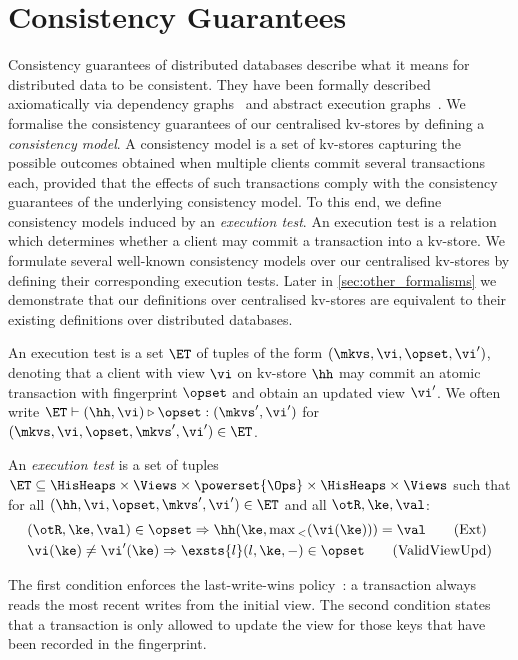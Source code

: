 \section{Consistency Guarantees}
\label{sec:cm}
Consistency guarantees of distributed databases describe
what it means for distributed data to be consistent. 
They have been formally described axiomatically via dependency graphs~\cite{adya-icde,adya}
and abstract execution graphs~\cite{ev_transactions,framework-concur}. 
We formalise the consistency guarantees of our centralised kv-stores by defining a 
\emph{consistency model}. 
A consistency model is a set of kv-stores capturing the possible outcomes 
obtained when multiple clients commit several transactions each, 
provided that the effects of such transactions comply with the consistency guarantees of the underlying consistency model. 
To this end, we define consistency models induced by an \emph{execution test}.
An execution test is a relation which determines whether a client may commit a transaction into a kv-store.  
We formulate several well-known consistency models over our centralised kv-stores 
by defining their corresponding execution tests. 
Later in \cref{sec:other_formalisms} we demonstrate that our definitions over centralised kv-stores are equivalent 
to their existing definitions over distributed databases.




An execution test is a set $\ET$ of tuples of the form $(\mkvs, \vi, \opset, \vi')$,
denoting that a client with view $\vi$ on kv-store $\hh$  may commit an atomic transaction 
with fingerprint $\opset$  and obtain an updated view $\vi'$. 
We often write
$\ET \vdash (\hh, \vi) \triangleright \opset: ( \mkvs', \vi')$ for
$(\mkvs, \vi, \opset, \mkvs', \vi') \in \ET$.


\begin{definition}
\label{def:execution.test}
An \emph{execution test} is a set of tuples $\ET \subseteq \HisHeaps \times \Views \times \powerset{\Ops} \times \HisHeaps \times \Views$ 
such that for all $(\hh, \vi, \opset, \mkvs', \vi') \in \ET$ and all $\otR, \ke, \val$:
\begin{align}
    & 
	(\otR, \ke, \val) \in \opset \Rightarrow
	\hh(\ke, \max{}_{<}(\vi(\ke))) = \val  
	\tag{Ext} \label{eq:read-external} \\
    & 
    \vi(\ke) \neq \vi'(\ke) 
    \Rightarrow
    \exsts{l} (l, \ke, -) \in \opset
    \tag{ValidViewUpd} \label{eq:valid-view-update}
\end{align}
\end{definition}
%
\noindent 
The first condition enforces the last-write-wins policy~\cite{vogels:2009:ec:1435417.1435432}: 
a transaction always reads the most recent writes from the initial view.  
The second condition states that a transaction is only allowed to update the view for those keys 
that have been recorded in the fingerprint.  


